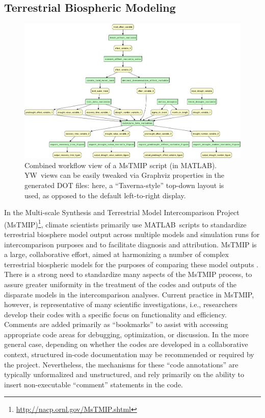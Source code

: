 \documentclass[15]{idcc}
\newcommand{\yw}{\textsf{YW}}
\newcommand{\MATLAB}{MATLAB}
\begin{document}
\subsection{Terrestrial Biospheric Modeling}\label{sec-MsTMIP}

  \begin{figure}[t]
   \centering
   \includegraphics[width=.99\textwidth]{figures/MsTMIP_combined-crop.pdf}
   \caption{Combined workflow view of a MsTMIP script (in
     \MATLAB). \yw\ views can be easily tweaked via Graphviz
     properties in the generated DOT files: here, a ``Taverna-style''
     top-down layout is used, as opposed to the default left-to-right
     display.}
   \label{fig-mstmip}
 \end{figure}


In the Multi-scale Synthesis and Terrestrial Model Intercomparison
Project (MsTMIP)\footnote{\url{http://nacp.ornl.gov/MsTMIP.shtml}},
climate scientists primarily use \MATLAB\ scripts to standardize
terrestrial biosphere model output across multiple models and
simulation runs for intercomparison purposes and to facilitate
diagnosis and attribution.
MsTMIP is a large, collaborative effort, aimed at harmonizing a number
of complex terrestrial biospheric models for the purposes of comparing
these model outputs \cite{huntzinger2013north}. There is a strong need
to standardize many aspects of the MsTMIP process, to assure greater
uniformity in the treatment of the codes and outputs of the disparate
models in the intercomparison analyses. Current practice in MsTMIP,
however, is representative of many scientific investigations, i.e.,
researchers develop their codes with a specific focus on functionality
and efficiency. Comments are added primarily as ``bookmarks'' to
assist with accessing appropriate code areas for debugging,
optimization, or discussion. In the more general case, depending on
whether the codes are developed in a collaborative context, structured
in-code documentation may be recommended or required by the
project. Nevertheless,  the mechanisms for these ``code annotations'' are
typically unformalized and unstructured, and rely primarily on the
ability to insert non-executable ``comment'' statements in the code.
\end{document}
